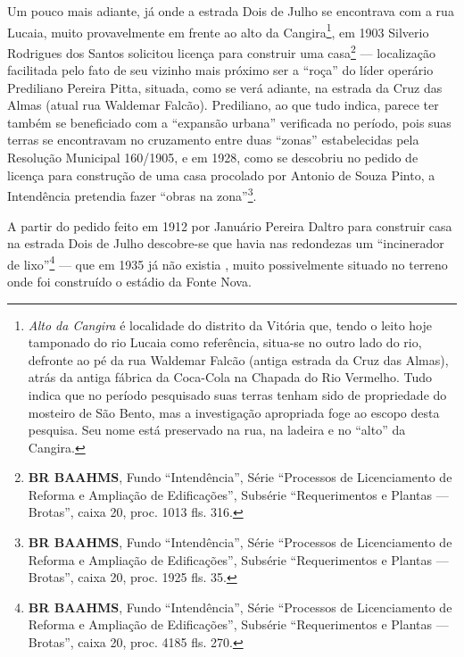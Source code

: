 Um pouco mais adiante, já onde a estrada Dois de Julho se encontrava com a rua Lucaia, muito provavelmente em frente ao alto da Cangira\footnote{\textit{Alto da Cangira} é localidade do distrito da Vitória que, tendo o leito hoje tamponado do rio Lucaia como referência, situa-se no outro lado do rio, defronte ao pé da rua Waldemar Falcão (antiga estrada da Cruz das Almas), atrás da antiga fábrica da Coca-Cola na Chapada do Rio Vermelho. Tudo indica que no período pesquisado suas terras tenham sido de propriedade do mosteiro de São Bento, mas a investigação apropriada foge ao escopo desta pesquisa. Seu nome está preservado na rua, na ladeira e no ``alto'' da Cangira.}, em 1903 Silverio Rodrigues dos Santos solicitou licença para construir uma casa\footnote{\textbf{BR BAAHMS}, Fundo ``Intendência'', Série ``Processos de Licenciamento de Reforma e Ampliação de Edificações'', Subsérie ``Requerimentos e Plantas --- Brotas'', caixa 20, proc. 1013 fls. 316.} --- localização facilitada pelo fato de seu vizinho mais próximo ser a ``roça'' do líder operário Prediliano Pereira Pitta, situada, como se verá adiante, na estrada da Cruz das Almas (atual rua Waldemar Falcão). Prediliano, ao que tudo indica, parece ter também se beneficiado com a ``expansão urbana'' verificada no período, pois suas terras se encontravam no cruzamento entre duas ``zonas'' estabelecidas pela Resolução Municipal 160/1905, e em 1928, como se descobriu no pedido de licença para construção de uma casa procolado por Antonio de Souza Pinto, a Intendência pretendia fazer ``obras na zona''\footnote{\textbf{BR BAAHMS}, Fundo ``Intendência'', Série ``Processos de Licenciamento de Reforma e Ampliação de Edificações'', Subsérie ``Requerimentos e Plantas --- Brotas'', caixa 20, proc. 1925 fls. 35.}.


A partir do pedido feito em 1912 por Januário Pereira Daltro para construir casa na estrada Dois de Julho descobre-se que havia nas redondezas um ``incinerador de lixo''\footnote{\textbf{BR BAAHMS}, Fundo ``Intendência'', Série ``Processos de Licenciamento de Reforma e Ampliação de Edificações'', Subsérie ``Requerimentos e Plantas --- Brotas'', caixa 20, proc. 4185 fls. 270.} ---  que em 1935 já não existia \cite{souza_guia_1935}, muito possivelmente situado no terreno onde foi construído o estádio da Fonte Nova. 


